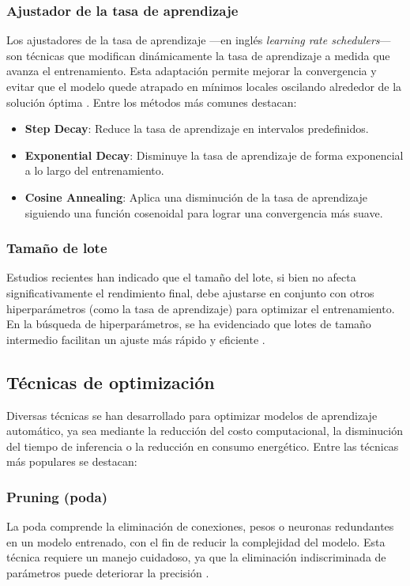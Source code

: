 \subsubsection{Ajustador de la tasa de aprendizaje}
Los ajustadores de la tasa de aprendizaje ---en inglés \textit{learning rate schedulers}--- son técnicas que modifican dinámicamente la tasa de aprendizaje a medida que avanza el entrenamiento. Esta adaptación permite mejorar la convergencia y evitar que el modelo quede atrapado en mínimos locales oscilando alrededor de la solución óptima \cite{Bengio2012}. Entre los métodos más comunes destacan:

\begin{itemize}
\setlength\itemsep{-0.3em}
    \item \textbf{Step Decay}: Reduce la tasa de aprendizaje en intervalos predefinidos.
    \item \textbf{Exponential Decay}: Disminuye la tasa de aprendizaje de forma exponencial a lo largo del entrenamiento.
    \item \textbf{Cosine Annealing}: Aplica una disminución de la tasa de aprendizaje siguiendo una función cosenoidal para lograr una convergencia más suave.
\end{itemize}

\subsubsection{Tamaño de lote}
Estudios recientes han indicado que el tamaño del lote, si bien no afecta significativamente el rendimiento final, debe ajustarse en conjunto con otros hiperparámetros (como la tasa de aprendizaje) para optimizar el entrenamiento. En la búsqueda de hiperparámetros, se ha evidenciado que lotes de tamaño intermedio facilitan un ajuste más rápido y eficiente \cite{Shallue2018, Breuel2015}.

\subsection{Técnicas de optimización}
Diversas técnicas se han desarrollado para optimizar modelos de aprendizaje automático, ya sea mediante la reducción del costo computacional, la disminución del tiempo de inferencia o la reducción en consumo energético. Entre las técnicas más populares se destacan:

\subsubsection{Pruning (poda)}
La poda comprende la eliminación de conexiones, pesos o neuronas redundantes en un modelo entrenado, con el fin de reducir la complejidad del modelo. Esta técnica requiere un manejo cuidadoso, ya que la eliminación indiscriminada de parámetros puede deteriorar la precisión \cite{Cheng2018}.

